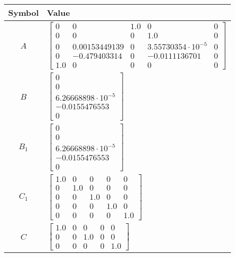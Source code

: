 \begin{tabular}{cl}
\hline
  Symbol  & Value                                                                                                                                                                                                  \\
\hline
   $A$    & $\left[\begin{matrix}0 & 0 & 1.0 & 0 & 0\\0 & 0 & 0 & 1.0 & 0\\0 & 0.00153449139 & 0 & 3.55730354 \cdot 10^{-5} & 0\\0 & -0.479403314 & 0 & -0.0111136701 & 0\\1.0 & 0 & 0 & 0 & 0\end{matrix}\right]$ \\
   $B$    & $\left[\begin{matrix}0\\0\\6.26668898 \cdot 10^{-5}\\-0.0155476553\\0\end{matrix}\right]$                                                                                                              \\
 $B_{1}$  & $\left[\begin{matrix}0\\0\\6.26668898 \cdot 10^{-5}\\-0.0155476553\\0\end{matrix}\right]$                                                                                                              \\
 $C_{1}$  & $\left[\begin{matrix}1.0 & 0 & 0 & 0 & 0\\0 & 1.0 & 0 & 0 & 0\\0 & 0 & 1.0 & 0 & 0\\0 & 0 & 0 & 1.0 & 0\\0 & 0 & 0 & 0 & 1.0\end{matrix}\right]$                                                       \\
   $C$    & $\left[\begin{matrix}1.0 & 0 & 0 & 0 & 0\\0 & 0 & 1.0 & 0 & 0\\0 & 0 & 0 & 0 & 1.0\end{matrix}\right]$                                                                                                 \\

\end{tabular}
